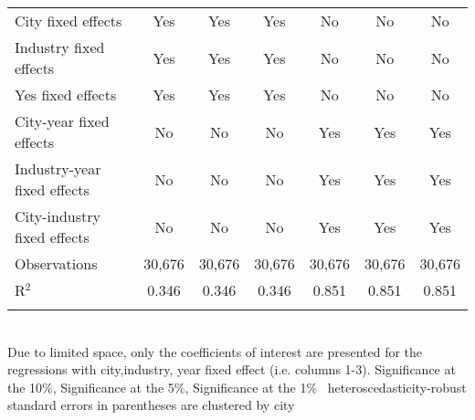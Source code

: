 \documentclass[12pt]{article}
\begin{document}
\begin{table}[!htbp]
\begin{adjustbox}{width=\textwidth, totalheight=\baselineskip,keepaspectratio}
\begin{tabular}{@{\extracolsep{5pt}}lcccccc}
City fixed effects & Yes & Yes & Yes & No & No & No \\ 
Industry fixed effects & Yes & Yes & Yes & No & No & No \\ 
Yes fixed effects & Yes & Yes & Yes & No & No & No \\ 
City-year fixed effects & No & No & No & Yes & Yes & Yes \\ 
Industry-year fixed effects & No & No & No & Yes & Yes & Yes \\ 
City-industry fixed effects & No & No & No & Yes & Yes & Yes \\ 
Observations & 30,676 & 30,676 & 30,676 & 30,676 & 30,676 & 30,676 \\ 
R$^{2}$ & 0.346 & 0.346 & 0.346 & 0.851 & 0.851 & 0.851 \\ 
\hline 
\hline \\[-1.8ex] 
\end{tabular}
\end{adjustbox}
\begin{tablenotes} 
 \small 
 \item \\ 
\footnotesize{
Due to limited space, only the coefficients of interest are presented 
for the regressions with city,industry, year fixed effect (i.e. columns 1-3).
\sym{*} Significance at the 10\%, \sym{**} Significance at the 5\%, \sym{***} Significance at the 1\% \
heteroscedasticity-robust standard errors in parentheses are clustered by city 
}
 
\end{tablenotes}
\end{table}
\end{document}
